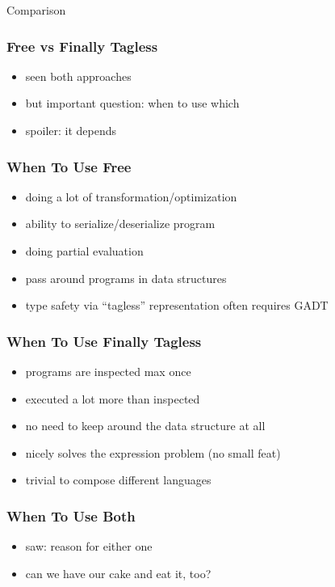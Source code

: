 \documentclass[aspectratio=169, hyperref={colorlinks, linkcolor=beamer@centricgreen}, urlcolor=links]{beamer}
\begin{document}
\begin{frame}
  \begin{center}
    \Huge
    Comparison
  \end{center}
\end{frame}

\begin{frame}
  \frametitle{Free vs Finally Tagless}
  \begin{itemize}
  \item seen both approaches
  \item but important question: when to use which
  \item spoiler: it depends
  \end{itemize}
\end{frame}

\begin{frame}
  \frametitle{When To Use Free}
  \begin{itemize}
  \item doing a lot of transformation/optimization
  \item ability to serialize/deserialize program
  \item doing partial evaluation
  \item pass around programs in data structures
  \item type safety via ``tagless'' representation often requires GADT
  \end{itemize}
\end{frame}

\begin{frame}
  \frametitle{When To Use Finally Tagless}
  \begin{itemize}
  \item programs are inspected max once
  \item executed a lot more than inspected
  \item no need to keep around the data structure at all
  \item nicely solves the expression problem (no small feat)
  \item trivial to compose different languages
  \end{itemize}
\end{frame}

\begin{frame}
  \frametitle{When To Use Both}
  \begin{itemize}
  \item saw: reason for either one
  \item can we have our cake and eat it, too?
  \end{itemize}
\end{frame}
\end{document}
